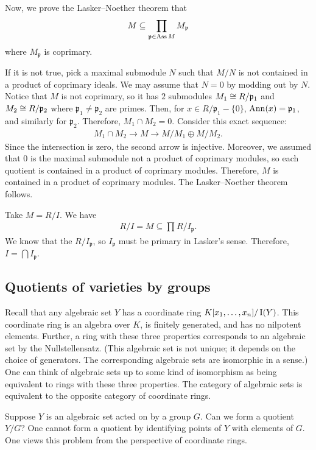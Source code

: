 \documentclass [11 pt, oneside, margin = 1 in] {article}
\begin{document}
Now, we prove the Lasker--Noether theorem that 
\begin{align*}
	M\subseteq \prod_{\mathfrak{p} \in \operatorname{Ass} M} M_{\mathfrak{p}}
\end{align*}
where $M_{\mathfrak{p}}$ is coprimary.  

If it is not true, pick a maximal submodule $N$ such that $M/N$ is not contained in a product of coprimary ideals. We may assume that $N=0$ by modding out by $N$. Notice that $M$ is not coprimary, so it has $2$ submodules $M_1\cong R/\mathfrak{p}_1$ and $M_2\cong R/\mathfrak{p}_2$ where $\mathfrak{p}_1\ne \mathfrak{p}_2$ are primes. Then, for $x\in R/\mathfrak{p}_1- \{0\}$, $\operatorname{Ann}(x)= \mathfrak{p}_1$, and similarly for $\mathfrak{p}_2$. Therefore, $M_1\cap M_2=0$. Consider this exact sequence:
\begin{align*}
	M_1\cap M_2 \longrightarrow M\longrightarrow M/M_1 \oplus M/M_2.
\end{align*}
Since the intersection is zero, the second arrow is injective. Moreover, we assumed that $0$ is the maximal submodule not a product of coprimary modules, so each quotient is contained in a product of coprimary modules. Therefore, $M$ is contained in a product of coprimary modules. The Lasker--Noether theorem follows.

Take $M=R/I$. We have 
\begin{align*}
	R/I = M \subseteq \prod_{} R/I_{\mathfrak{p}}.
\end{align*}
We know that the $R/I_{\mathfrak{p}}$, so $I_\mathfrak{p}$ must be primary in Lasker's sense. Therefore, $I=\bigcap I_\mathfrak{p}$.

\subsection{Quotients of varieties by groups}
Recall that any algebraic set $Y$ has a coordinate ring $K[x_1,\hdots, x_n]/\operatorname{I}(Y)$. This coordinate ring is an algebra over $K$, is finitely generated, and has no nilpotent elements. Further, a ring with these three properties corresponds to an algebraic set by the Nullstellensatz. (This algebraic set is not unique; it depends on the choice of generators. The corresponding algebraic sets are isomorphic in a sense.) One can think of algebraic sets up to some kind of isomorphism as being equivalent to rings with these three properties. The category of algebraic sets is equivalent to the opposite category of coordinate rings. 

Suppose $Y$ is an algebraic set acted on by a group $G$. Can we form a quotient $Y/G$? One cannot form a quotient by identifying points of $Y$ with elements of $G$. One views this problem from the perspective of coordinate rings. 
\end{document}
